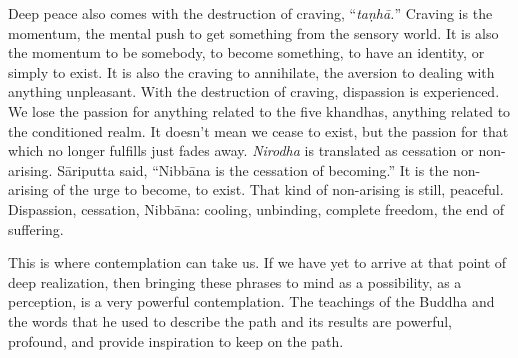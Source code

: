 Deep peace also comes with the destruction of craving, ``\emph{taṇhā.}'' Craving is the momentum, the mental push to get something from the sensory world. It is also the momentum to be somebody, to become something, to have an identity, or simply to exist. It is also the craving to annihilate, the aversion to dealing with anything unpleasant. With the destruction of craving, dispassion is experienced. We lose the passion for anything related to the five khandhas, anything related to the conditioned realm. It doesn't mean we cease to exist, but the passion for that which no longer fulfills just fades away. \emph{Nirodha} is translated as cessation or non-arising. Sāriputta said, ``Nibbāna is the cessation of becoming.'' It is the non-arising of the urge to become, to exist. That kind of non-arising is still, peaceful. Dispassion, cessation, Nibbāna: cooling, unbinding, complete freedom, the end of suffering.

This is where contemplation can take us. If we have yet to arrive at that point of deep realization, then bringing these phrases to mind as a possibility, as a perception, is a very powerful contemplation. The teachings of the Buddha and the words that he used to describe the path and its results are powerful, profound, and provide inspiration to keep on the path.
